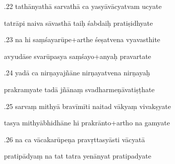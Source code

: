 \documentclass[article,12pt,a4paper]{memoir}%
\newcounter{parCount}
\begin{document}
	  
	  \pstart {}.22 tathānyathā sarvathā ca yasyāvācyatvam ucyate 
	{}
	\pend%
      

	  
	  \pstart \leavevmode%
	tatrāpi naiva sāvasthā taiḥ śabdaiḥ pratiṣidhyate 
	{}
	\pend%
      

	  
	  \pstart {}.23 na hi saṃśayarūpe+arthe śeṣatvena vyavasthite 
	{}
	\pend%
      

	  
	  \pstart \leavevmode%
	avyudāse svarūpasya saṃśayo+anyaḥ pravartate 
	{}
	\pend%
      

	  
	  \pstart {}.24 yadā ca nirṇayajñāne nirṇayatvena nirṇayaḥ 
	{}
	\pend%
      

	  
	  \pstart \leavevmode%
	prakramyate tadā jñānaṃ svadharmeṇāvatiṣṭhate 
	{}
	\pend%
      

	  
	  \pstart {}.25 sarvaṃ mithyā bravīmīti naitad vākyaṃ vivakṣyate 
	{}
	\pend%
      

	  
	  \pstart \leavevmode%
	tasya mithyābhidhāne hi prakrānto+artho na gamyate 
	{}
	\pend%
      

	  
	  \pstart {}.26 na ca vācakarūpeṇa pravṛttasyāsti vācyatā 
	{}
	\pend%
      

	  
	  \pstart \leavevmode%
	pratipādyaṃ na tat tatra yenānyat pratipadyate 
	{}
	\pend%
      
\end{document}

